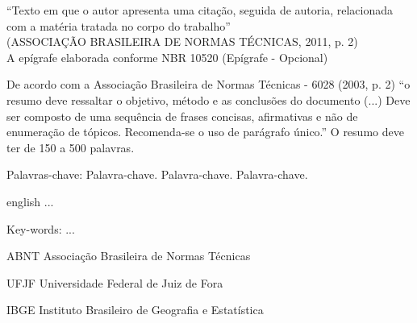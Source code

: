 \documentclass[
        12pt,
        openany, %
        oneside, %
        a4paper,
        english,
        brazil			        %
        ]{abntbibufjf}
\begin{document}
\begin{epigrafe}
    \vspace*{\fill}
	\begin{flushright}
		``Texto em que o autor apresenta uma cita\c{c}\~ao, seguida de autoria, relacionada com a
  mat\'eria tratada no corpo do trabalho'' \\
(ASSOCIA\c{C}\~AO BRASILEIRA DE NORMAS T\'ECNICAS, 2011, p. 2) \\
  A ep\'igrafe elaborada conforme NBR 10520 (Ep\'igrafe - Opcional)
	\end{flushright}
\end{epigrafe}



\setlength{\absparsep}{18pt}
\begin{resumo}
De acordo com a Associa\c{c}\~ao Brasileira de Normas T\'ecnicas - 6028 (2003, p. 2) ``o resumo deve ressaltar
o objetivo, m\'etodo e as conclus\~oes do documento (...) Deve ser composto de uma sequ\^encia de frases
concisas, afirmativas e n\~ao de enumera\c{c}\~ao de t\'opicos. Recomenda-se o uso de par\'agrafo \'unico.''
O resumo deve ter de 150 a 500 palavras.

Palavras-chave: Palavra-chave. Palavra-chave. Palavra-chave. %

\end{resumo}


\begin{resumo}[ABSTRACT]
 \begin{otherlanguage*}{english}
   ...

Key-words: ...
 \end{otherlanguage*}
\end{resumo}


\listoffigures*
\cleardoublepage



\begin{siglas} %
  \item[ABNT] Associa\c{c}\~ao Brasileira de Normas T\'ecnicas
  \item[UFJF] Universidade Federal de Juiz de Fora
  \item[IBGE] Instituto Brasileiro de Geografia e Estat\'istica
\end{siglas}
\end{document}
